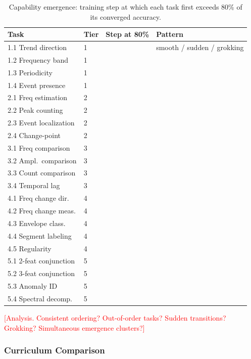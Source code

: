 \documentclass[11pt]{article}
\newcommand{\placeholder}[1]{\textcolor{red}{[#1]}}
\begin{document}
\begin{table}[t]
\centering
\small
\caption{Capability emergence: training step at which each task first exceeds 80\% of its converged accuracy.}
\label{tab:emergence}
\begin{tabular}{llcl}
\toprule
\textbf{Task} & \textbf{Tier} & \textbf{Step at 80\%} & \textbf{Pattern} \\
\midrule
1.1 Trend direction      & 1 &  & smooth / sudden / grokking \\
1.2 Frequency band       & 1 &  &  \\
1.3 Periodicity          & 1 &  &  \\
1.4 Event presence       & 1 &  &  \\
\midrule
2.1 Freq estimation      & 2 &  &  \\
2.2 Peak counting        & 2 &  &  \\
2.3 Event localization   & 2 &  &  \\
2.4 Change-point         & 2 &  &  \\
\midrule
3.1 Freq comparison      & 3 &  &  \\
3.2 Ampl.\ comparison    & 3 &  &  \\
3.3 Count comparison     & 3 &  &  \\
3.4 Temporal lag         & 3 &  &  \\
\midrule
4.1 Freq change dir.     & 4 &  &  \\
4.2 Freq change meas.    & 4 &  &  \\
4.3 Envelope class.      & 4 &  &  \\
4.4 Segment labeling     & 4 &  &  \\
4.5 Regularity           & 4 &  &  \\
\midrule
5.1 2-feat conjunction   & 5 &  &  \\
5.2 3-feat conjunction   & 5 &  &  \\
5.3 Anomaly ID           & 5 &  &  \\
5.4 Spectral decomp.     & 5 &  &  \\
\bottomrule
\end{tabular}
\end{table}

\placeholder{Analysis. Consistent ordering? Out-of-order tasks? Sudden transitions? Grokking? Simultaneous emergence clusters?}


\subsubsection{Curriculum Comparison}
\end{document}
